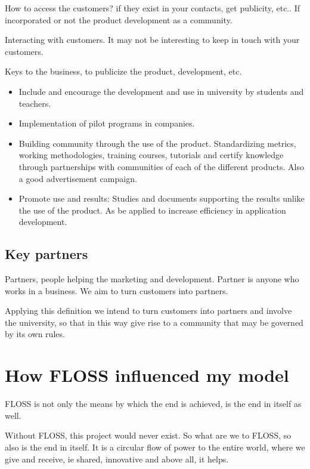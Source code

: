 \documentclass[11pt]{scrartcl}
\begin{document}
\par How to access the customers? if they exist in your contacts, get publicity, etc.. If incorporated or not the product development as a community.

\par Interacting with customers. It may not be interesting to keep in touch with your customers.

\par Keys to the business, to publicize the product, development, etc.
\begin{itemize}
    \item Include and encourage the development and use in university by students and teachers.
    \item Implementation of pilot programs in companies.
    \item Building community through the use of the product. Standardizing metrics, working methodologies, training courses, tutorials and certify knowledge through partnerships with communities of each of the different products. Also a good advertisement campaign.
    \item Promote use and results: Studies and documents supporting the results unlike the use of the product. As be applied to increase efficiency in application development.
\end{itemize}

\subsection{Key partners}

\par Partners, people helping the marketing and development. Partner is anyone who works in a business. We aim to turn customers into partners.

\par Applying this definition we intend to turn customers into partners and involve the university, so that in this way give rise to a community that may be governed by its own rules.

\section{How FLOSS influenced my model}

\par FLOSS is not only the means by which the end is achieved, is the end in itself as well.

\par Without FLOSS, this project would never exist. So what are we to FLOSS, so also is the end in itself. It is a circular flow of power to the entire world, where we give and receive, ie shared, innovative and above all, it helps.
\end{document}
